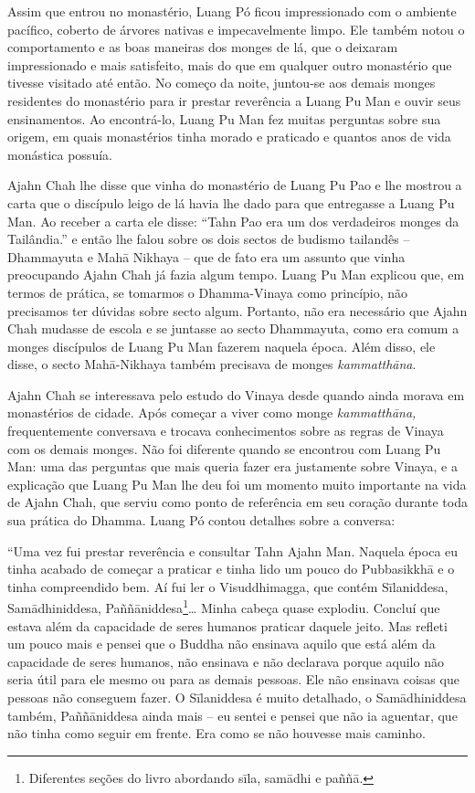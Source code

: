 Assim que entrou no monastério, Luang Pó ficou impressionado com o
ambiente pacífico, coberto de árvores nativas e impecavelmente limpo.
Ele também notou o comportamento e as boas maneiras dos monges de lá,
que o deixaram impressionado e mais satisfeito, mais do que em qualquer
outro monastério que tivesse visitado até então. No começo da noite,
juntou-se aos demais monges residentes do monastério para ir prestar
reverência a Luang Pu Man e ouvir seus ensinamentos. Ao encontrá-lo,
Luang Pu Man fez muitas perguntas sobre sua origem, em quais monastérios
tinha morado e praticado e quantos anos de vida monástica possuía.

Ajahn Chah lhe disse que vinha do monastério de Luang Pu Pao e lhe
mostrou a carta que o discípulo leigo de lá havia lhe dado para que
entregasse a Luang Pu Man. Ao receber a carta ele disse: ``Tahn Pao era
um dos verdadeiros monges da Tailândia.'' e então lhe falou sobre os
dois sectos de budismo tailandês -- Dhammayuta e Mahā Nikhaya -- que de
fato era um assunto que vinha preocupando Ajahn Chah já fazia algum
tempo. Luang Pu Man explicou que, em termos de prática, se tomarmos o
Dhamma-Vinaya como princípio, não precisamos ter dúvidas sobre secto
algum. Portanto, não era necessário que Ajahn Chah mudasse de escola e
se juntasse ao secto Dhammayuta, como era comum a monges discípulos de
Luang Pu Man fazerem naquela época. Além disso, ele disse, o secto
Mahā-Nikhaya também precisava de monges \emph{kammatthāna}.

Ajahn Chah se interessava pelo estudo do Vinaya desde quando ainda
morava em monastérios de cidade. Após começar a viver como monge
\emph{kammatthāna,} frequentemente conversava e trocava conhecimentos
sobre as regras de Vinaya com os demais monges. Não foi diferente quando
se encontrou com Luang Pu Man: uma das perguntas que mais queria fazer
era justamente sobre Vinaya, e a explicação que Luang Pu Man lhe deu foi
um momento muito importante na vida de Ajahn Chah, que serviu como ponto
de referência em seu coração durante toda sua prática do Dhamma. Luang
Pó contou detalhes sobre a conversa:

``Uma vez fui prestar reverência e consultar Tahn Ajahn Man. Naquela
época eu tinha acabado de começar a praticar e tinha lido um pouco do
Pubbasikkhā e o tinha compreendido bem. Aí fui ler o Visuddhimagga, que
contém Sīlaniddesa, Samādhiniddesa, Paññāniddesa\footnote{Diferentes
  seções do livro abordando sīla, samādhi e paññā.}\ldots{} Minha cabeça
quase explodiu. Concluí que estava além da capacidade de seres humanos
praticar daquele jeito. Mas refleti um pouco mais e pensei que o Buddha
não ensinava aquilo que está além da capacidade de seres humanos, não
ensinava e não declarava porque aquilo não seria útil para ele mesmo ou
para as demais pessoas. Ele não ensinava coisas que pessoas não
conseguem fazer. O Sīlaniddesa é muito detalhado, o Samādhiniddesa
também, Paññāniddesa ainda mais -- eu sentei e pensei que não ia
aguentar, que não tinha como seguir em frente. Era como se não houvesse
mais caminho.

